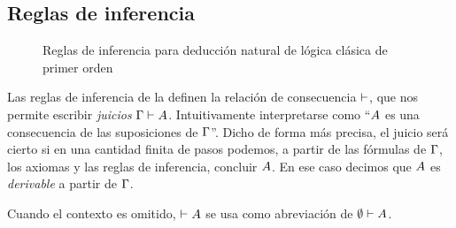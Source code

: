 \subsection{Reglas de inferencia}

\begin{figure}[H]
    \begin{multicols}{2}
        \proofTreeFalseE
        \proofTreeTrueI
    \end{multicols}
    
    \begin{multicols}{2}
        \proofTreeLEM
        \proofTreeAx
    \end{multicols}

    \proofSpacing

    \proofTreeAndI

    \begin{multicols}{2}
        \proofTreeAndEOne
        \proofTreeAndETwo
    \end{multicols}

    \proofSpacing

    \begin{multicols}{2}
        \proofTreeOrIOne
        \proofTreeOrITwo
    \end{multicols}
    
    \proofTreeOrE

    \proofSpacing

    \begin{multicols}{2}
        \proofTreeImpI
        \proofTreeImpE
    \end{multicols}
    \begin{multicols}{2}
        \proofTreeNotI
        \proofTreeNotE
    \end{multicols}

    \proofSpacing

    \begin{multicols}{2}
        \proofTreeForallI
        \proofTreeForallE
    \end{multicols}

    \proofSpacing

    \proofTreeExistsI
    \proofTreeExistsE

    \caption{Reglas de inferencia para deducción natural de lógica clásica de primer orden}
    \label{nd:inference-rules}
\end{figure}


\begin{definition}
    Las reglas de inferencia de la  definen la
    relación de consecuencia $\vdash$, que nos permite escribir \textit{juicios}
    $\Gamma \vdash A$. Intuitivamente interpretarse como ``$A$ es una
    consecuencia de las suposiciones de $\Gamma$''. Dicho de forma más precisa, el
    juicio será cierto si en una cantidad finita de pasos podemos, a partir de
    las fórmulas de $\Gamma$, los axiomas y las reglas de inferencia, concluir
    $A$. En ese caso decimos que $A$ es \textit{derivable} a partir de
    $\Gamma$.
    
    Cuando el contexto es omitido, $\vdash A$ se usa como abreviación de
    $\emptyset \vdash A$.
\end{definition}

